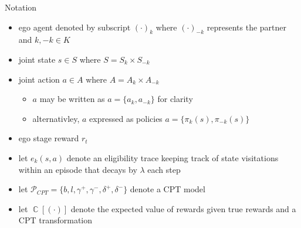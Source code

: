 \documentclass[aspectratio=1610, xcolor=dvipsnames]{packages/beamer}
\DeclareMathOperator{\CPT}{\mathbb{C}}
\newcommand{\joint}[1]{#1}
\begin{document}
\begin{frame}{Notation}
\begin{itemize}
    \item ego agent denoted by subscript $(\cdot)_k$ where $(\cdot)_{-k}$ represents the partner and $k,-k \in K$
    \item joint state $\joint{s} \in \joint{S}$ where $ \joint{S} = S_{k} \times S_{-k}$
    \item joint action $\joint{a} \in \joint{A}$ where $ \joint{A} = A_{k} \times A_{-k}$
    \begin{itemize}
        \item $\joint{a}$ may be written as $\joint{a}=\{a_k,a_{-k}\}$ for clarity
        \item alternativley, $\joint{a}$ expressed as policies $\joint{a}=\{\pi_{k}(\joint{s}),\pi_{-k}(\joint{s})\}$
    \end{itemize}
    \item ego stage reward $r_t$
    \item let $e_k(\joint{s},\joint{a})$ denote an eligibility trace keeping track of state visitations within an episode that decays by $\lambda$ each step
    \item let $\mathcal{P}_{CPT} = \{b,l,\gamma^{+},\gamma^{-},\delta^{+},\delta^{-}\}$ denote a CPT model
  \item let $\CPT[(\cdot)]$ denote the expected value of rewards given true rewards and a CPT transformation
\end{itemize}

\end{frame}
\end{document}
